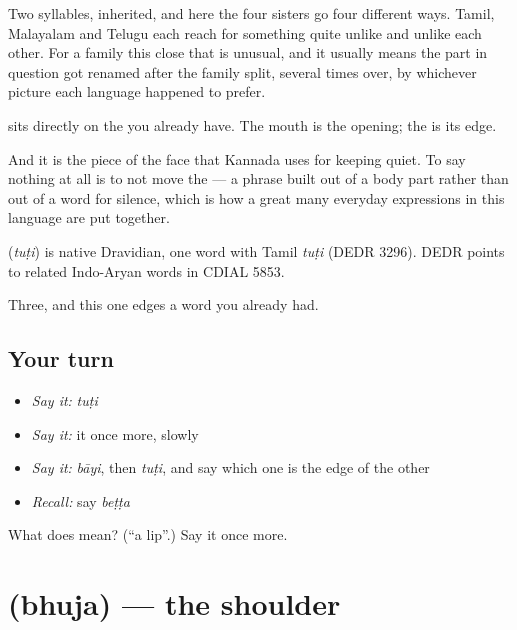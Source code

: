 Two syllables, inherited, and here the four sisters go four different ways. Tamil, Malayalam and Telugu each reach for something quite unlike  and unlike each other. For a family this close that is unusual, and it usually means the part in question got renamed after the family split, several times over, by whichever picture each language happened to prefer.

 sits directly on the  you already have. The mouth is the opening; the  is its edge.

And it is the piece of the face that Kannada uses for keeping quiet. To say nothing at all is to not move the  — a phrase built out of a body part rather than out of a word for silence, which is how a great many everyday expressions in this language are put together.

\begin{cousinweb}
\textbf{} (\emph{tuṭi}) is native Dravidian, one word with Tamil \emph{tuṭi} (DEDR 3296). DEDR points to related Indo-Aryan words in CDIAL 5853.
\end{cousinweb}

\begin{grammarlens}[title={What you've built}]
Three, and this one edges a word you already had.
\end{grammarlens}

\subsection*{Your turn}
\begin{itemize}
\raggedright
  \item \emph{Say it:} \emph{tuṭi}
  \item \emph{Say it:} it once more, slowly
  \item \emph{Say it:} \emph{bāyi}, then \emph{tuṭi}, and say which one is the edge of the other
  \item \emph{Recall:} say \emph{beṭṭa}
\end{itemize}

\begin{tcolorbox}[breakable,colback=teal!4,colframe=teal!35!black,title={Before you move on}]
What does  mean? (\textquotedblleft{}a lip\textquotedblright{}.) Say it once more.
\end{tcolorbox}
\section[\texorpdfstring{\kn{ಭುಜ} (bhuja)}{ಭುಜ (bhuja)}]{ (bhuja) — the shoulder}

